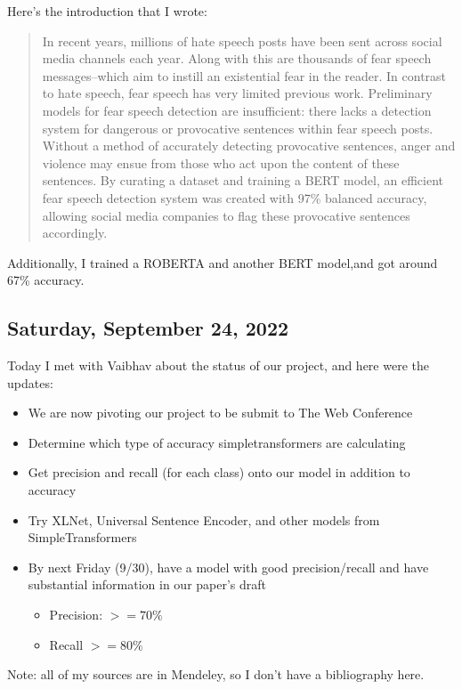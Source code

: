 \documentclass[11pt,letterpaper]{article}
\begin{document}
Here's the introduction that I wrote:
\begin{quote}
In recent years, millions of hate speech posts have been sent across social media channels each year. Along with this are thousands of fear speech messages–which aim to instill an existential fear in the reader. In contrast to hate speech, fear speech has very limited previous work. Preliminary models for fear speech detection are insufficient: there lacks a detection system for dangerous or provocative sentences within fear speech posts. Without a method of accurately detecting provocative sentences, anger and violence may ensue from those who act upon the content of these sentences. By curating a dataset and training a BERT model, an efficient fear speech detection system was created with 97\% balanced accuracy, allowing social media companies to flag these provocative sentences accordingly.
\end{quote}

Additionally, I trained a ROBERTA and another BERT model,and got around 67\% accuracy.

\subsection{Saturday, September 24, 2022}
Today I met with Vaibhav about the status of our project, and here were the updates:
\begin{itemize}
    \item We are now pivoting our project to be submit to The Web Conference
    \item Determine which type of accuracy simpletransformers are calculating
    \item Get precision and recall (for each class) onto our model in addition to accuracy
    \item Try XLNet, Universal Sentence Encoder, and other models from SimpleTransformers
    \item By next Friday (9/30), have a model with good precision/recall and have substantial information in our paper's draft
    \begin{itemize}
        \item Precision: $>= 70\%$
        \item Recall $>= 80\%$ 
    \end{itemize}
\end{itemize}



\newpage
Note: all of my sources are in Mendeley, so I don't have a bibliography here.
\end{document}
